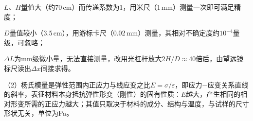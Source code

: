 \documentclass[12pt,a4paper,fontset=windows]{ctexart}
\begin{document}
$L$、$H$量值大（约70\,cm）而传递系数为1，用米尺（1\,mm）测量一次即可满足精度；

$D$量值较小（3.5\,cm），用游标卡尺（0.02\,mm）测量，其相对不确定度约$10^{-4}$量级，可忽略；

$\Delta L$为mm级微小量，无法直接测量，改用光杠杆放大$2H/D\approx40$倍后，由望远镜标尺读出$\Delta x$间接求得。

\vspace{0.2cm}
（2）杨氏模量是弹性范围内正应力与线应变之比$E=\sigma/\varepsilon$，即应力$-$应变关系直线的斜率，表征材料本身抵抗弹性形变（刚性）的固有性质：$E$越大，产生相同的相对形变所需的正应力越大；其值只取决于材料的成分、结构与温度，与试样的尺寸形状无关，单位为Pa。
\end{document}
